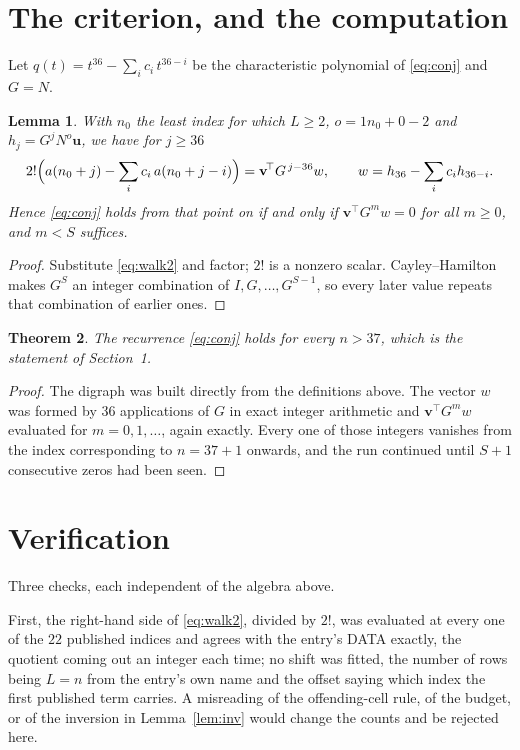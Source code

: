 \documentclass[11pt,a4paper]{article}
\theoremstyle{plain}
\newtheorem{theorem}{Theorem}
\newtheorem{lemma}[theorem]{Lemma}
\theoremstyle{definition}
\begin{document}
\section{The criterion, and the computation}

Let $q(t)=t^{36}-\sum_i c_i\,t^{36-i}$ be the characteristic polynomial of
\eqref{eq:conj} and $G=N$.

\begin{lemma}\label{lem:crit}
With $n_0$ the least index for which $L\ge2$, $o=1n_0+0-2$ and
$h_j=G^{j}N^{o}\mathbf{u}$, we have for $j\ge36$
\[
2!\Bigl(a(n_0+j)-\sum_i c_i\,a(n_0+j-i)\Bigr)=\mathbf{v}^{\!\top}G^{\,j-36}w,
\qquad w=h_{36}-\sum_i c_i h_{36-i} .
\]
Hence \eqref{eq:conj} holds from that point on if and only if
$\mathbf{v}^{\!\top}G^{m}w=0$ for all $m\ge0$, and $m<S$ suffices.
\end{lemma}

\begin{proof}
Substitute \eqref{eq:walk2} and factor; $2!$ is a nonzero scalar. Cayley--Hamilton
makes $G^{S}$ an integer combination of $I,G,\dots,G^{S-1}$, so every later value repeats
that combination of earlier ones.
\end{proof}

\begin{theorem}
The recurrence \eqref{eq:conj} holds for every $n>37$, which is the statement of
Section~1.
\end{theorem}

\begin{proof}
The digraph was built directly from the definitions above. The vector $w$ was formed by
$36$ applications of $G$ in exact integer arithmetic and $\mathbf{v}^{\!\top}G^{m}w$
evaluated for $m=0,1,\dots$, again exactly. Every one of those integers vanishes from the
index corresponding to $n=37+1$ onwards, and the run continued until $S+1$ consecutive
zeros had been seen.
\end{proof}

\section{Verification}

Three checks, each independent of the algebra above.

First, the right-hand side of \eqref{eq:walk2}, divided by $2!$, was evaluated at every
one of the $22$ published indices and agrees with the entry's DATA exactly, the quotient
coming out an integer each time; no shift was fitted, the number of rows being
$L=n$ from the entry's own name and the offset saying which index the first published
term carries. A misreading of the offending-cell rule, of the budget, or of the inversion in
Lemma~\ref{lem:inv} would change the counts and be rejected here.
\end{document}
